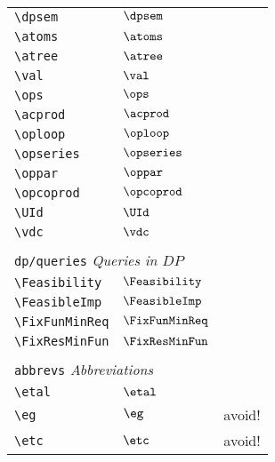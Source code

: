 \begin{longtable}{lll}
 {\color[rgb]{0.5,0.5,0.5}\texttt{\textbackslash dpsem}} & $\dpsem$ & \\ 
 {\color[rgb]{0.5,0.5,0.5}\texttt{\textbackslash atoms}} & $\atoms$ & \\ 
 {\color[rgb]{0.5,0.5,0.5}\texttt{\textbackslash atree}} & $\atree$ & \\ 
 {\color[rgb]{0.5,0.5,0.5}\texttt{\textbackslash val}} & $\val$ & \\ 
 {\color[rgb]{0.5,0.5,0.5}\texttt{\textbackslash ops}} & $\ops$ & \\ 
 {\color[rgb]{0.5,0.5,0.5}\texttt{\textbackslash acprod}} & $\acprod$ & \\ 
 {\color[rgb]{0.5,0.5,0.5}\texttt{\textbackslash oploop}} & $\oploop$ & \\ 
 {\color[rgb]{0.5,0.5,0.5}\texttt{\textbackslash opseries}} & $\opseries$ & \\ 
 {\color[rgb]{0.5,0.5,0.5}\texttt{\textbackslash oppar}} & $\oppar$ & \\ 
 {\color[rgb]{0.5,0.5,0.5}\texttt{\textbackslash opcoprod}} & $\opcoprod$ & \\ 
 {\color[rgb]{0.5,0.5,0.5}\texttt{\textbackslash UId}} & $\UId$ & \\ 
 {\color[rgb]{0.5,0.5,0.5}\texttt{\textbackslash vdc}} & $\vdc$ & \\ 
  &  & \\ 
 \multicolumn{3}{l}{{\color[rgb]{0.5,0.5,0.5}\texttt{dp/queries}} \emph{Queries in $DP$}}\\ 
 \hline
{\color[rgb]{0.5,0.5,0.5}\texttt{\textbackslash Feasibility}} & $\Feasibility$ & \\ 
 {\color[rgb]{0.5,0.5,0.5}\texttt{\textbackslash FeasibleImp}} & $\FeasibleImp$ & \\ 
 {\color[rgb]{0.5,0.5,0.5}\texttt{\textbackslash FixFunMinReq}} & $\FixFunMinReq$ & \\ 
 {\color[rgb]{0.5,0.5,0.5}\texttt{\textbackslash FixResMinFun}} & $\FixResMinFun$ & \\ 
  &  & \\ 
 \multicolumn{3}{l}{{\color[rgb]{0.5,0.5,0.5}\texttt{abbrevs}} \emph{Abbreviations}}\\ 
 \hline
\hline
{\color[rgb]{0.5,0.5,0.5}\texttt{\textbackslash etal}} & $\etal$ & \\ 
 {\color[rgb]{0.5,0.5,0.5}\texttt{\textbackslash eg}} & $\eg$ &  avoid!\\ 
 {\color[rgb]{0.5,0.5,0.5}\texttt{\textbackslash etc}} & $\etc$ &  avoid!\\ 

\end{longtable}
